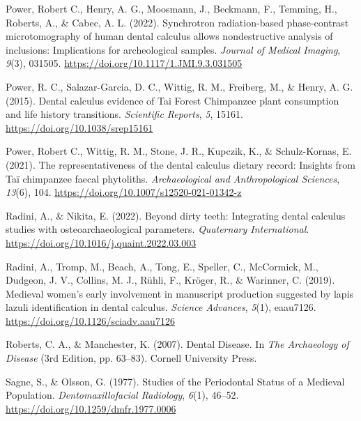 \documentclass[
  b5paper,
]{book}
\newlength{\cslhangindent}
\newlength{\cslentryspacingunit} %
\newenvironment{CSLReferences}[2] %
 {%
  \setlength{\parindent}{0pt}
  \ifodd #1
  \let\oldpar\par
  \def\par{\hangindent=\cslhangindent\oldpar}
  \fi
  \setlength{\parskip}{#2\cslentryspacingunit}
 }%
 {}
\begin{document}
\begin{CSLReferences}{1}{0}
\leavevmode{}%
Power, Robert C., Henry, A. G., Moosmann, J., Beckmann, F., Temming, H.,
Roberts, A., \& Cabec, A. L. (2022). Synchrotron radiation-based
phase-contrast microtomography of human dental calculus allows
nondestructive analysis of inclusions: Implications for archeological
samples. \emph{Journal of Medical Imaging}, \emph{9}(3), 031505.
\url{https://doi.org/10.1117/1.JMI.9.3.031505}

\leavevmode{}%
Power, R. C., Salazar-Garcia, D. C., Wittig, R. M., Freiberg, M., \&
Henry, A. G. (2015). Dental calculus evidence of {Tai Forest Chimpanzee}
plant consumption and life history transitions. \emph{Scientific
Reports}, \emph{5}, 15161. \url{https://doi.org/10.1038/srep15161}

\leavevmode{}%
Power, Robert C., Wittig, R. M., Stone, J. R., Kupczik, K., \&
Schulz-Kornas, E. (2021). The representativeness of the dental calculus
dietary record: Insights from {Ta{ï}} chimpanzee faecal phytoliths.
\emph{Archaeological and Anthropological Sciences}, \emph{13}(6), 104.
\url{https://doi.org/10.1007/s12520-021-01342-z}

\leavevmode{}%
Radini, A., \& Nikita, E. (2022). Beyond dirty teeth: {Integrating}
dental calculus studies with osteoarchaeological parameters.
\emph{Quaternary International}.
\url{https://doi.org/10.1016/j.quaint.2022.03.003}

\leavevmode{}%
Radini, A., Tromp, M., Beach, A., Tong, E., Speller, C., McCormick, M.,
Dudgeon, J. V., Collins, M. J., Rühli, F., Kröger, R., \& Warinner, C.
(2019). Medieval women's early involvement in manuscript production
suggested by lapis lazuli identification in dental calculus.
\emph{Science Advances}, \emph{5}(1), eaau7126.
\url{https://doi.org/10.1126/sciadv.aau7126}

\leavevmode{}%
Roberts, C. A., \& Manchester, K. (2007). Dental {Disease}. In \emph{The
{Archaeology} of {Disease}} (3rd Edition, pp. 63--83). {Cornell
University Press}.

\leavevmode{}%
Sagne, S., \& Olsson, G. (1977). Studies of the {Periodontal Status} of
a {Medieval Population}. \emph{Dentomaxillofacial Radiology},
\emph{6}(1), 46--52. \url{https://doi.org/10.1259/dmfr.1977.0006}


\end{CSLReferences}
\end{document}
